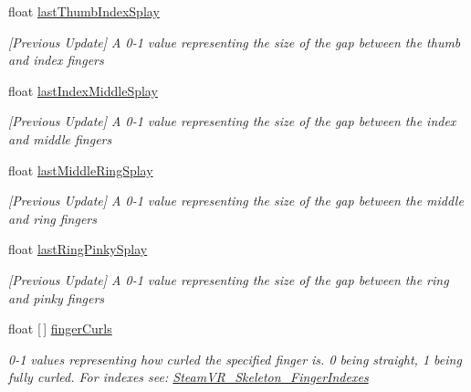 \begin{DoxyCompactItemize}
float \mbox{\hyperlink{class_valve_1_1_v_r_1_1_steam_v_r___action___skeleton___source_a765af83dcfd5cfa898e0ada7c94afeee}{last\+Thumb\+Index\+Splay}}
\begin{DoxyCompactList}\small\item\em \mbox{[}Previous Update\mbox{]} A 0-\/1 value representing the size of the gap between the thumb and index fingers \end{DoxyCompactList}\item 
float \mbox{\hyperlink{class_valve_1_1_v_r_1_1_steam_v_r___action___skeleton___source_a8bd182b3e5643a197add997e66f51a91}{last\+Index\+Middle\+Splay}}
\begin{DoxyCompactList}\small\item\em \mbox{[}Previous Update\mbox{]} A 0-\/1 value representing the size of the gap between the index and middle fingers \end{DoxyCompactList}\item 
float \mbox{\hyperlink{class_valve_1_1_v_r_1_1_steam_v_r___action___skeleton___source_a44f2709c947cd957b45809768ab3f245}{last\+Middle\+Ring\+Splay}}
\begin{DoxyCompactList}\small\item\em \mbox{[}Previous Update\mbox{]} A 0-\/1 value representing the size of the gap between the middle and ring fingers \end{DoxyCompactList}\item 
float \mbox{\hyperlink{class_valve_1_1_v_r_1_1_steam_v_r___action___skeleton___source_a762a1fc95f5d6fe0b6830e119b578b6a}{last\+Ring\+Pinky\+Splay}}
\begin{DoxyCompactList}\small\item\em \mbox{[}Previous Update\mbox{]} A 0-\/1 value representing the size of the gap between the ring and pinky fingers \end{DoxyCompactList}\item 
float \mbox{[}$\,$\mbox{]} \mbox{\hyperlink{class_valve_1_1_v_r_1_1_steam_v_r___action___skeleton___source_a15a77d357e4e87b039735a2eb3cf9ea1}{finger\+Curls}}
\begin{DoxyCompactList}\small\item\em 0-\/1 values representing how curled the specified finger is. 0 being straight, 1 being fully curled. For indexes see\+: \mbox{\hyperlink{class_valve_1_1_v_r_1_1_steam_v_r___skeleton___finger_indexes}{Steam\+V\+R\+\_\+\+Skeleton\+\_\+\+Finger\+Indexes}} \end{DoxyCompactList}\item 

\end{DoxyCompactItemize}
